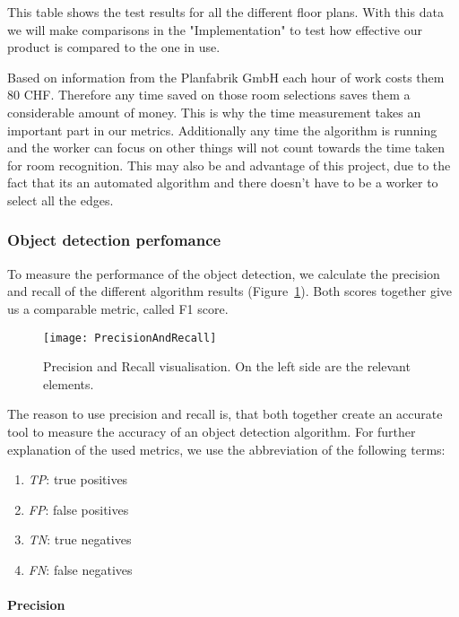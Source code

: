This table shows the test results for all the different floor plans. With this data we will make comparisons in the "Implementation" to test how effective our product is compared to the one in use.

Based on information from the Planfabrik GmbH each hour of work costs them 80 CHF. Therefore any time saved on those room selections saves them a considerable amount of money. This is why the time measurement takes an important part in our metrics. Additionally any time the algorithm is running and the worker can focus on other things will not count towards the time taken for room recognition. This may also be and advantage of this project, due to the fact that its an automated algorithm and there doesn't have to be a worker to select all the edges.

\subsubsection{Object detection perfomance}
\label{sub:ObjectDetectionPerfomance}

To measure the performance of the object detection, we calculate the precision and recall of the different algorithm results (Figure~\ref{fig:PrecisionAndRecall}). Both scores together give us a comparable metric, called F1 score.

\begin{figure}[H]
	\centering
	\texttt{[image: PrecisionAndRecall]}
	\caption{Precision and Recall visualisation. On the left side are the relevant elements.}
	\label{fig:PrecisionAndRecall}
\end{figure}

The reason to use precision and recall is, that both together create an accurate tool to measure the accuracy of an object detection algorithm. For further explanation of the used metrics, we use the abbreviation of the following terms:

\begin{enumerate}[label=]
    \item \textit{TP}: true positives
    \item \textit{FP}: false positives
    \item \textit{TN}: true negatives
    \item \textit{FN}: false negatives
\end{enumerate}

\paragraph{Precision}
\label{sub:Precision}

